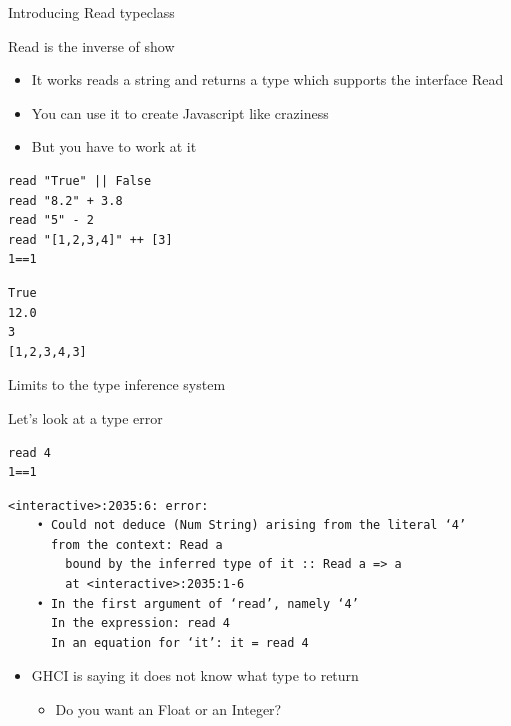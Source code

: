\documentclass[presetation]{beamer}
\begin{document}
\begin{frame}[fragile,label={sec:orge2c35bd}]{Introducing Read typeclass}
 \begin{block}{Read is the inverse of show}
\begin{itemize}
\item It works reads a string and returns a type which supports the interface Read
\end{itemize}
\pause
\begin{itemize}
\item You can use it to create Javascript like craziness
\end{itemize}
\pause
\begin{itemize}
\item \alert{But you have to work at it}
\end{itemize}
\begin{verbatim}
read "True" || False                          
read "8.2" + 3.8                                    
read "5" - 2         
read "[1,2,3,4]" ++ [3]
1==1
\end{verbatim}

\begin{verbatim}
True
12.0
3
[1,2,3,4,3]
\end{verbatim}
\end{block}
\end{frame}

\begin{frame}[fragile,label={sec:org116d181}]{Limits to the type inference system}
 \begin{block}{Let's look at a type error}
\begin{verbatim}
read 4
1==1
\end{verbatim}

\begin{verbatim}
<interactive>:2035:6: error:
    • Could not deduce (Num String) arising from the literal ‘4’
      from the context: Read a
        bound by the inferred type of it :: Read a => a
        at <interactive>:2035:1-6
    • In the first argument of ‘read’, namely ‘4’
      In the expression: read 4
      In an equation for ‘it’: it = read 4
\end{verbatim}

\begin{itemize}
\item GHCI is saying it does not know what type to return
\begin{itemize}
\item Do you want an Float or an Integer?
\end{itemize}
\end{itemize}
\end{block}
\end{frame}
\end{document}
